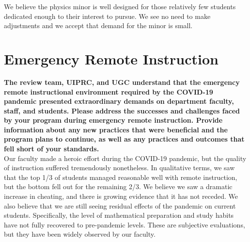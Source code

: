 \documentclass[12pt]{article}
\begin{document}
We believe the physics minor is well designed for those relatively few
students dedicated enough to their interest to pursue.  We see no need
to make adjustments and we accept that demand for the minor is small.

\newpage
\section{Emergency Remote Instruction}
\label{sec:remote}

{\bf The review team, UIPRC, and UGC understand that the emergency
  remote instructional environment required by the COVID-19 pandemic
  presented extraordinary demands on department faculty, staff, and
  students. Please address the successes and challenges faced by your
  program during emergency remote instruction. Provide information
  about any new practices that were beneficial and the program plans
  to continue, as well as any practices and outcomes that fell short
  of your standards.}\\[3pt]


\noindent
Our faculty made a heroic effort during the COVID-19 pandemic, but the
quality of instruction suffered tremendously nonetheless.  In
qualitative terms, we saw that the top 1/3 of students managed
reasonable well with remote instruction, but the bottom fell out for
the remaining 2/3.  We believe we saw a dramatic increase in cheating,
and there is growing evidence that it has not receded.  We also
believe that we are still seeing residual effects of the pandemic on
current students.  Specifically, the level of mathematical preparation
and study habits have not fully recovered to pre-pandemic levels.
These are subjective evaluations, but they have been widely observed
by our faculty.
\end{document}
